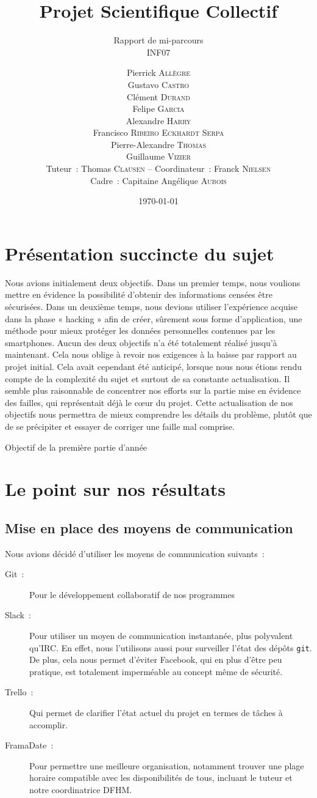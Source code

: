 \documentclass[a4paper, 12pt,twoside]{article}
\title{Projet Scientifique Collectif}
\author{Pierrick \textsc{Allègre} \\
        Gustavo \textsc{Castro} \\
        Clément \textsc{Durand} \\
        Felipe \textsc{Garcia} \\
        Alexandre \textsc{Harry} \\
        Francisco \textsc{Ribeiro Eckhardt Serpa} \\
        Pierre-Alexandre \textsc{Thomas} \\
        Guillaume \textsc{Vizier} \\
        Tuteur~: Thomas \textsc{Clausen} -- Coordinateur~: Franck \textsc{Nielsen} \\
        Cadre~: Capitaine Angélique \textsc{Aubois} \\}
\subtitle{Rapport de mi-parcours \\ INF07}
\date{\today}
\begin{document}
\maketitle
\renewcommand{\baselinestretch}{1.1}
\setlength{\parskip}{0.5em}
\tableofcontents
\clearpage

\section*{Présentation succincte du sujet}
    Nous avions initialement deux objectifs. Dans un premier temps, nous voulions mettre en évidence la possibilité d’obtenir des informations censées être sécurisées. Dans un deuxième temps, nous devions utiliser l’expérience acquise dans la phase « hacking » afin de créer, sûrement sous forme d’application, une méthode pour mieux protéger les données personnelles contenues par les smartphones.
	Aucun des deux objectifs n'a été totalement réalisé jusqu'à maintenant. Cela nous oblige à revoir nos exigences à la baisse par rapport au projet initial. Cela avait cependant été anticipé, lorsque nous nous étions rendu compte de la complexité du sujet et surtout de sa constante actualisation. Il semble plus raisonnable de concentrer nos efforts sur la partie mise en évidence des failles, qui représentait déjà le cœur du projet.
	Cette actualisation de nos objectifs nous permettra de mieux comprendre les détails du problème, plutôt que de se précipiter
et essayer de corriger une faille mal comprise.
    
    Objectif de la première partie d'année

\newpage
\section{Le point sur nos résultats}

    \subsection{Mise en place des moyens de communication}

    Nous avions décidé d'utiliser les moyens de communication suivants~:
    \begin{description}
        \item[Git~:] Pour le développement collaboratif de nos programmes
        \item[Slack~:] Pour utiliser un moyen de communication instantanée, plus polyvalent qu'IRC. En effet, nous l'utilisons aussi pour surveiller l'état des dépôts \verb!git!. De plus, cela nous permet d'éviter Facebook, qui en plus d'être peu pratique, est totalement imperméable au concept même de sécurité.
        \item[Trello~:] Qui permet de clarifier l'état actuel du projet en termes de tâches à accomplir.
        \item[FramaDate~:] Pour permettre une meilleure organisation, notamment trouver une plage horaire compatible avec les disponibilités de tous, incluant le tuteur et notre coordinatrice DFHM.
    \end{description}
\end{document}
